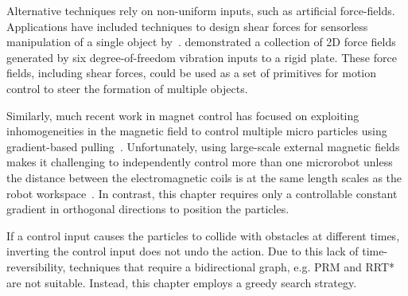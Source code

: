 Alternative techniques rely on non-uniform inputs, such as artificial force-fields.
Applications have included techniques to design shear forces for sensorless manipulation of a single object by~\cite{lamiraux+2001:ra}.  
\cite{vose2012sliding} demonstrated a collection of 2D force fields generated by six degree-of-freedom vibration inputs to a rigid plate.  These force fields, including shear forces, could be used as a set of primitives for motion control to steer the formation of multiple objects. %

Similarly, much recent work in magnet control has focused on exploiting inhomogeneities in the magnetic field to control multiple micro particles  using gradient-based pulling~\cite{Salmanipour2018EightDOF,Denasi2018independent}.  
Unfortunately, using large-scale external magnetic fields makes it challenging to independently control more than one microrobot unless the  distance between the electromagnetic coils is at the same length scales as the robot workspace~\cite{diller2016six, Denasi2018independent, Salmanipour2018EightDOF }. In contrast, %
 this chapter requires only a controllable constant gradient in orthogonal directions to position the particles.

If a control input causes the particles to collide with obstacles at different times, inverting the control input does not undo the action. 
 Due to this lack of time-reversibility, techniques that require a bidirectional graph, e.g. PRM \cite{kavraki1996probabilistic} and RRT* \cite{lavalle2006planning} are not suitable.
  Instead, this chapter employs a greedy search strategy. 